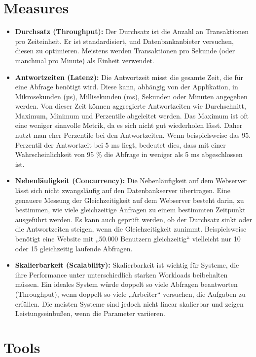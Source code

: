 \section{Measures}
\begin{itemize}[label={--}]
    \item \textbf{Durchsatz (Throughput):} Der Durchsatz ist die Anzahl an Transaktionen pro Zeiteinheit.
    Er ist standardisiert, und Datenbankanbieter versuchen, diesen zu optimieren.
    Meistens werden Transaktionen pro Sekunde (oder manchmal pro Minute) als Einheit verwendet.
    \item \textbf{Antwortzeiten (Latenz):} Die Antwortzeit misst die gesamte Zeit, die für eine Abfrage benötigt wird.
    Diese kann, abhängig von der Applikation, in Mikrosekunden (µs), Millisekunden (ms), Sekunden oder Minuten angegeben werden.
    Von dieser Zeit können aggregierte Antwortzeiten wie Durchschnitt, Maximum, Minimum und Perzentile abgeleitet werden.
    Das Maximum ist oft eine weniger sinnvolle Metrik, da es sich nicht gut wiederholen lässt.
    Daher nutzt man eher Perzentile bei den Antwortzeiten.
    Wenn beispielsweise das 95. Perzentil der Antwortzeit bei 5 ms liegt, bedeutet dies, dass mit einer Wahrscheinlichkeit von 95 \% die Abfrage in weniger als 5 ms abgeschlossen ist.
    \item \textbf{Nebenläufigkeit (Concurrency):} Die Nebenläufigkeit auf dem Webserver lässt sich nicht zwangsläufig auf den Datenbankserver übertragen.
    Eine genauere Messung der Gleichzeitigkeit auf dem Webserver besteht darin, zu bestimmen, wie viele gleichzeitige Anfragen zu einem bestimmten Zeitpunkt ausgeführt werden.
    Es kann auch geprüft werden, ob der Durchsatz sinkt oder die Antwortzeiten steigen, wenn die Gleichzeitigkeit zunimmt.
    Beispielsweise benötigt eine Website mit „50.000 Benutzern gleichzeitig“ vielleicht nur 10 oder 15 gleichzeitig laufende Abfragen.
    \item \textbf{Skalierbarkeit (Scalability):} Skalierbarkeit ist wichtig für Systeme, die ihre Performance unter unterschiedlich starken Workloads beibehalten müssen.
    Ein ideales System würde doppelt so viele Abfragen beantworten (Throughput), wenn doppelt so viele „Arbeiter“ versuchen, die Aufgaben zu erfüllen.
    Die meisten Systeme sind jedoch nicht linear skalierbar und zeigen Leistungseinbußen, wenn die Parameter variieren.
\end{itemize}


\section{Tools}\label{sec:tools}

